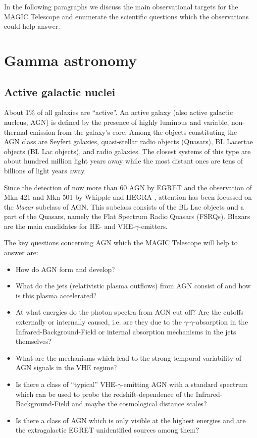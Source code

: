 In the following paragraphs we discuss the main observational targets for
the MAGIC Telescope and enumerate the scientific questions which the
observations could help answer.

\section{Gamma astronomy}

\subsection{Active galactic nuclei}

\medskip About 1\% of all galaxies are ``active''. An active galaxy (also active
galactic nucleus, AGN) is defined by the presence of highly luminous and
variable, non-thermal emission from the galaxy's core. Among the
objects constituting the AGN class are Seyfert galaxies,
quasi-stellar radio objects (Quasars), BL Lacertae objects (BL Lac objects),
and radio galaxies. The closest systems of this type are about hundred
million light years away while the most distant ones are tens of billions of
light years away.

Since the detection of now more than 60 AGN by EGRET and the observation of
Mkn 421 and Mkn 501 by Whipple \cite{punch:92,quinn:96} and HEGRA \cite
{petry:96,bradbury:97}, attention has been focussed on the 
{\it blazar}
subclass of AGN. This subclass consists of the BL Lac objects and a part of
the Quasars, namely the Flat Spectrum Radio Quasars (FSRQs). Blazars are the
main candidates for HE- and VHE-$\gamma $-emitters.

The key questions concerning AGN which the MAGIC Telescope will help to
answer are:

\begin{itemize}
\item  How do AGN form and develop?

\item  What do the jets (relativistic plasma outflows) from AGN consist of
and how is this plasma accelerated?

\item  At what energies do the photon spectra from AGN cut off? Are the
cutoffs externally or internally caused, i.e. are they due to the $\gamma $-$%
\gamma $-absorption in the Infrared-Background-Field or internal absorption
mechanisms in the jets themselves?

\item  What are the mechanisms which lead to the strong temporal variability
of AGN signals in the VHE regime?

\item  Is there a class of ``typical'' VHE-$\gamma $-emitting AGN with a
standard spectrum which can be used to probe the redshift-dependence of the
Infrared-Background-Field and maybe the cosmological distance scales?

\item  Is there a class of AGN which is only visible at the highest energies
and are the extragalactic EGRET unidentified sources among them?
\end{itemize}

